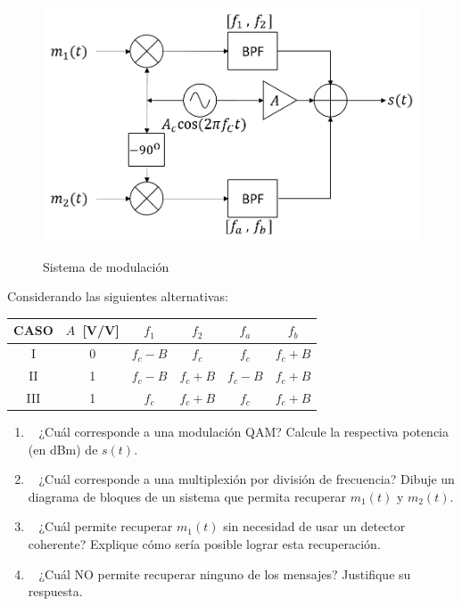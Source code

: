 \begin{enumerate}
	\vspace{200px}
\begin{figure}[h!]
	\captionsetup{justification = raggedright, singlelinecheck = false}
	\caption{Sistema de modulación} 
	\centering
	\includegraphics[scale=0.4]{Imagenes/qam.png}
	\label{fig:qam}
\end{figure}
Considerando las siguientes alternativas:
\begin{center}
	\begin{tabular}{cccccc}
		CASO & $A$~[V/V] & $f_1$ & $f_2$ & $f_a$ & $f_b$ \\ \hline
		I & 0 & $f_c-B$ & $f_c$ & $f_c$ & $f_c+B$ \\
		II & 1 & $f_c-B$ & $f_c+B$ & $f_c-B$ & $f_c+B$ \\
		III & 1 & $f_c$ & $f_c+B$ & $f_c$ & $f_c+B$ \\
	\end{tabular}
\end{center}
\begin{enumerate}
	\item~ ¿Cuál corresponde a una modulación QAM? Calcule la respectiva potencia (en dBm) de $s(t)$.
	
	\item~ ¿Cuál corresponde a una multiplexión por división de frecuencia? Dibuje un diagrama de bloques de un sistema que permita recuperar $m_1(t)$ y $m_2(t)$.
	
	\item~ ¿Cuál permite recuperar $m_1(t)$ sin necesidad de usar un detector coherente? Explique cómo sería posible lograr esta recuperación.
	
	\item~ ¿Cuál NO permite recuperar ninguno de los mensajes? Justifique su respuesta. 
	
\end{enumerate}
\end{enumerate}

